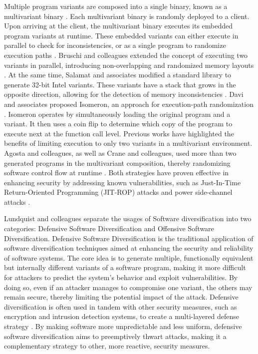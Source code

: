 Multiple program variants are composed into a single binary, known as a multivariant binary \cite{cox06}. 
Each multivariant binary is randomly deployed to a client.
Upon arriving at the client, the multivariant binary executes its embedded program variants at runtime. 
These embedded variants can either execute in parallel to check for inconsistencies, or as a single program to randomize execution paths \cite{bhatkar03}. 
Bruschi and colleagues extended the concept of executing two variants in parallel, introducing non-overlapping and randomized memory layouts \cite{bruschi2007diversified}. 
At the same time, Salamat and associates modified a standard library to generate 32-bit Intel variants. These variants have a stack that grows in the opposite direction, allowing for the detection of memory inconsistencies \cite{salamat2007stopping}. 
Davi and associates proposed Isomeron, an approach for execution-path randomization \cite{davi2015isomeron}. 
Isomeron operates by simultaneously loading the original program and a variant. It then uses a coin flip to determine which copy of the program to execute next at the function call level. 
Previous works have highlighted the benefits of limiting execution to only two variants in a multivariant environment. 
Agosta and colleagues, as well as Crane and colleagues, used more than two generated programs in the multivariant composition, thereby randomizing software control flow at runtime \cite{agosta2015meet, crane2015thwarting}. 
Both strategies have proven effective in enhancing security by addressing known vulnerabilities, such as Just-In-Time Return-Oriented Programming (JIT-ROP) attacks \cite{jackson2011compiler} and power side-channel attacks \cite{amarilli2011can}. 
\cite{sinatra}

Lundquist and colleagues \cite{offensive_div} separate the usages of Software diversification into two categories: Defensive Software Diversification and Offensive Software Diversification.
Defensive Software Diversification is the traditional application of software diversification techniques aimed at enhancing the security and reliability of software systems.
The core idea is to generate multiple, functionally equivalent but internally different variants of a software program, making it more difficult for attackers to predict the system's behavior and exploit vulnerabilities. 
By doing so, even if an attacker manages to compromise one variant, the others may remain secure, thereby limiting the potential impact of the attack.
Defensive diversification is often used in tandem with other security measures, such as encryption and intrusion detection systems, to create a multi-layered defense strategy \cite{cryptography4020013}. 
By making software more unpredictable and less uniform, defensive software diversification aims to preemptively thwart attacks, making it a complementary strategy to other, more reactive, security measures.

